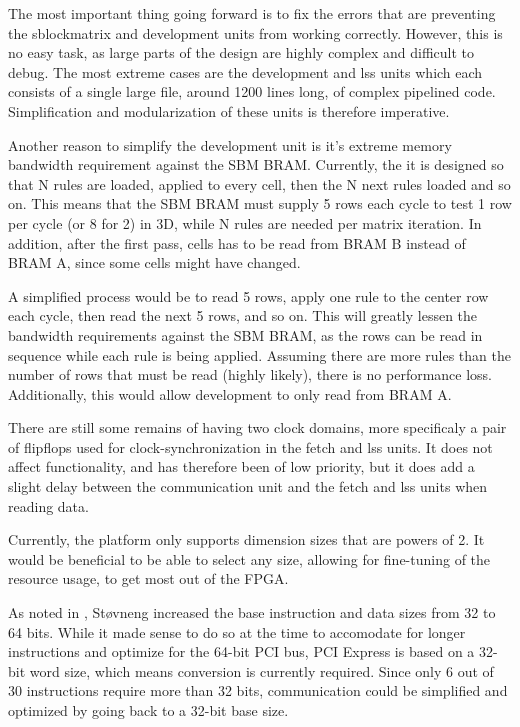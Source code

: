 The most important thing going forward is to fix the errors that are preventing the sblockmatrix and development units from working correctly.
However, this is no easy task, as large parts of the design are highly complex and difficult to debug.
The most extreme cases are the development and lss units which each consists of a single large file, around 1200 lines long, of complex pipelined code.
Simplification and modularization of these units is therefore imperative.

Another reason to simplify the development unit is it's extreme memory bandwidth requirement against the SBM BRAM.
Currently, the it is designed so that N rules are loaded, applied to every cell, then the N next rules loaded and so on.
This means that the SBM BRAM must supply 5 rows each cycle to test 1 row per cycle (or 8 for 2) in 3D, while N rules are needed per matrix iteration.
In addition, after the first pass, cells has to be read from BRAM B instead of BRAM A, since some cells might have changed.

A simplified process would be to read 5 rows, apply one rule to the center row each cycle, then read the next 5 rows, and so on.
This will greatly lessen the bandwidth requirements against the SBM BRAM, as the rows can be read in sequence while each rule is being applied.
Assuming there are more rules than the number of rows that must be read (highly likely), there is no performance loss.
Additionally, this would allow development to only read from BRAM A.

There are still some remains of having two clock domains, more specificaly a pair of flipflops used for clock-synchronization in the fetch and lss units.
It does not affect functionality, and has therefore been of low priority, but it does add a slight delay between the communication unit and the fetch and lss units when reading data.

Currently, the platform only supports dimension sizes that are powers of 2.
It would be beneficial to be able to select any size, allowing for fine-tuning of the resource usage, to get most out of the FPGA.

As noted in \cite{stovneng2014sblock}, Støvneng increased the base instruction and data sizes from 32 to 64 bits.
While it made sense to do so at the time to accomodate for longer instructions and optimize for the 64-bit PCI bus, PCI Express is based on a 32-bit word size, which means conversion is currently required.
Since only 6 out of 30 instructions require more than 32 bits, communication could be simplified and optimized by going back to a 32-bit base size.


